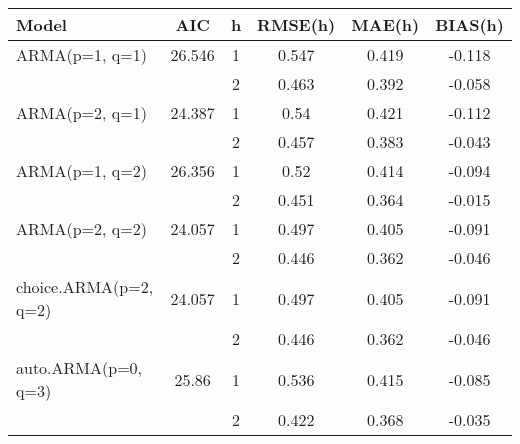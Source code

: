 \begin{table}[ht]
\centering
\begin{tabular}{|l|c||c|ccc|}
  \hline
\hline
Model & AIC & h & RMSE(h) & MAE(h) & BIAS(h) \\ 
  \hline
ARMA(p=1, q=1) & 26.546 & 1 & 0.547 & 0.419 & -0.118 \\ 
   &  & 2 & 0.463 & 0.392 & -0.058 \\ 
   \hline
ARMA(p=2, q=1) & 24.387 & 1 & 0.54 & 0.421 & -0.112 \\ 
   &  & 2 & 0.457 & 0.383 & -0.043 \\ 
   \hline
ARMA(p=1, q=2) & 26.356 & 1 & 0.52 & 0.414 & -0.094 \\ 
   &  & 2 & 0.451 & 0.364 & -0.015 \\ 
   \hline
ARMA(p=2, q=2) & 24.057 & 1 & 0.497 & 0.405 & -0.091 \\ 
   &  & 2 & 0.446 & 0.362 & -0.046 \\ 
   \hline
choice.ARMA(p=2, q=2) & 24.057 & 1 & 0.497 & 0.405 & -0.091 \\ 
   &  & 2 & 0.446 & 0.362 & -0.046 \\ 
   \hline
auto.ARMA(p=0, q=3) & 25.86 & 1 & 0.536 & 0.415 & -0.085 \\ 
   &  & 2 & 0.422 & 0.368 & -0.035 \\ 
   \hline
\hline
\end{tabular}
\end{table}
